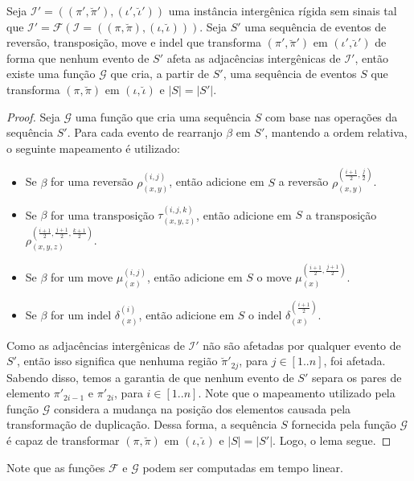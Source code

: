 \begin{lemma}\label{lemma:GTTULLOM}
Seja $\mathcal{I'} = ((\pi',\breve\pi'),(\iota',\breve\iota'))$ uma instância intergênica rígida sem sinais tal que $\mathcal{I'}=\mathcal{F}(\mathcal{I}=((\pi,\breve\pi),(\iota,\breve\iota)))$. Seja $S'$ uma sequência de eventos de reversão, transposição, move e indel que transforma $(\pi',\breve\pi')$ em $(\iota',\breve\iota')$ de forma que nenhum evento de $S'$ afeta as adjacências intergênicas de $\mathcal{I'}$, então existe uma função $\mathcal{G}$ que cria, a partir de $S'$, uma sequência de eventos $S$ que transforma $(\pi,\breve\pi)$ em $(\iota,\breve\iota)$ e $|S|=|S'|$.
\end{lemma}
\begin{proof}
Seja $\mathcal{G}$ uma função que cria uma sequência $S$ com base nas operações da sequência $S'$. Para cada evento de rearranjo $\beta$ em $S'$, mantendo a ordem relativa, o seguinte mapeamento é utilizado:
\begin{itemize}
  \item Se $\beta$ for uma reversão $\rho^{(i,j)}_{(x,y)}$, então adicione em $S$ a reversão $\rho^{(\frac{i+1}{2},\frac{j}{2})}_{(x,y)}$.
  \item Se $\beta$ for uma transposição $\tau^{(i,j,k)}_{(x,y,z)}$, então adicione em $S$ a transposição $\rho^{(\frac{i+1}{2},\frac{j+1}{2},\frac{k+1}{2})}_{(x,y,z)}$.
  \item Se $\beta$ for um move $\mu^{(i,j)}_{(x)}$, então adicione em $S$ o move $\mu^{(\frac{i+1}{2},\frac{j+1}{2})}_{(x)}$.
  \item Se $\beta$ for um indel $\delta^{(i)}_{(x)}$, então adicione em $S$ o indel $\delta^{(\frac{i+1}{2})}_{(x)}$. 
\end{itemize}
Como as adjacências intergênicas de $\mathcal{I'}$ não são afetadas por qualquer evento de $S'$, então isso significa que nenhuma região $\breve\pi'_{2j}$, para $j\in[1..n]$, foi afetada. Sabendo disso, temos a garantia de que nenhum evento de $S'$ separa os pares de elemento $\pi'_{2i-1}$ e $\pi'_{2i}$, para $i\in[1..n]$. Note que o mapeamento utilizado pela função $\mathcal{G}$ considera a mudança na posição dos elementos causada pela transformação de duplicação. Dessa forma, a sequência $S$ fornecida pela função $\mathcal{G}$ é capaz de transformar $(\pi,\breve\pi)$ em $(\iota,\breve\iota)$ e $|S|=|S'|$. Logo, o lema segue.
\end{proof}

Note que as funções $\mathcal{F}$ e $\mathcal{G}$ podem ser computadas em tempo linear.

